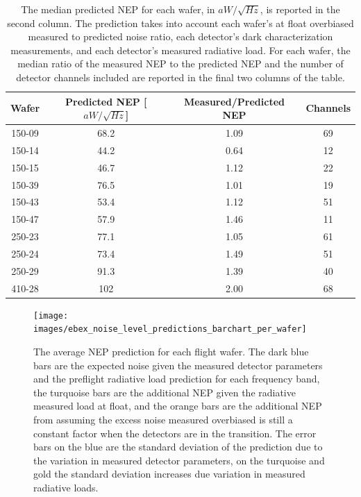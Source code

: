 \begin{table}[ht!]
\begin{center}
\begin{tabular}{|c|c|c|c|}
\hline  Wafer & Predicted NEP [$aW/\sqrt{Hz}$] & Measured/Predicted NEP & Channels \\
\hline 150-09 & 68.2 & 1.09 & 69 \\
\hline 150-14 & 44.2 & 0.64 & 12 \\
\hline 150-15 & 46.7 & 1.12 & 22 \\
\hline 150-39 & 76.5 & 1.01 & 19 \\
\hline 150-43 & 53.4 & 1.12 & 51 \\
\hline 150-47 & 57.9 & 1.46 & 11 \\
\hline 250-23 & 77.1 & 1.05 & 61 \\
\hline 250-24 & 73.4 & 1.49 & 51 \\
\hline 250-29 & 91.3 & 1.39 & 40 \\
\hline 410-28 & 102 & 2.00 & 68 \\
\hline
\end{tabular}
\end{center}
\caption{The median predicted \ac{NEP} for each wafer, in $aW/\sqrt{Hz}$, is reported in the second column. The prediction takes into account each wafer's at float overbiased measured to predicted noise ratio, each detector's dark characterization measurements, and each detector's measured radiative load. For each wafer, the median ratio of the measured \ac{NEP} to the predicted \ac{NEP} and the number of detector channels included are reported in the final two columns of the table. }
\label{in_transition_noise_table}
\end{table}

\begin{figure}[ht!]
\begin{center}
\texttt{[image: images/ebex\_noise\_level\_predictions\_barchart\_per\_wafer]}
\caption{The average \ac{NEP} prediction for each flight wafer. The dark blue bars are the expected noise given the measured detector parameters and the preflight radiative load prediction for each frequency band, the turquoise bars are the additional \ac{NEP} given the radiative measured load at float, and the orange bars are the additional \ac{NEP} from assuming the excess noise measured overbiased is still a constant factor when the detectors are in the transition. The error bars on the blue are the standard deviation of the prediction due to the variation in measured detector parameters, on the turquoise and gold the standard deviation increases due variation in measured radiative loads. }
\label{fig:nep_prediction_barchart}
\end{center}
\end{figure}






